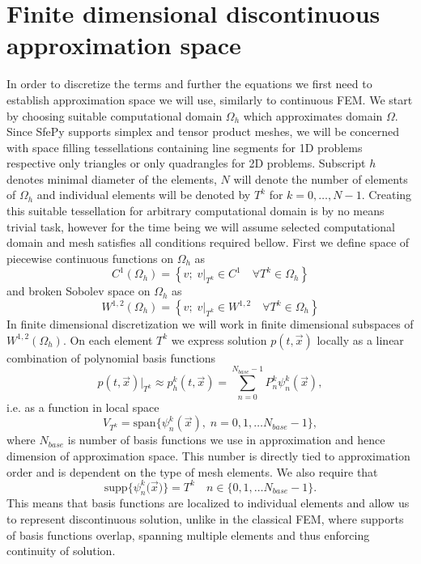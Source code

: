 \section{Finite dimensional discontinuous approximation space}
In order to discretize the terms and further the equations we first need to 
establish approximation space we will use, similarly to continuous FEM. We 
start by choosing suitable computational domain $\Omega_h$ which approximates 
domain $\Omega$. Since SfePy supports simplex and tensor product meshes, we 
will be concerned with space filling tessellations containing line segments 
for 1D problems respective only triangles or only quadrangles for 2D 
problems. Subscript $h$ denotes minimal diameter of the elements, 
$N$ will denote the number of elements of $\Omega_h$ and individual elements 
will be denoted by $T^k$ for $k=0, \ldots, N - 1$. Creating this suitable 
tessellation for arbitrary computational domain is by no means trivial task, 
however for the time being we will assume selected computational domain and 
mesh satisfies all conditions required bellow. First we define space of 
piecewise continuous functions  on $\Omega_h$ as 
\begin{equation}\label{eq:sp_conth}
    C^1(\Omega_h) =  \left\{v;\; v\vert_{T^k} \in C^1 \quad \forall T^k \in 
    \Omega_h \right\}
\end{equation}
and broken Sobolev space on $\Omega_h$ as
\begin{equation}\label{eq:sp_sobh}
    W^{1, 2}(\Omega_h) = \left\{v;\; v\vert_{T^k} \in W^{1, 2}\quad \forall T^k 
    \in \Omega_h \right\}
\end{equation}
In finite dimensional discretization we will work in finite dimensional 
subspaces of $W^{1, 2}(\Omega_h)$. On each element $T^k$ we express 
solution $p(t, \vec{x})$ locally as a linear combination of polynomial basis functions
\begin{equation}
\label{eq:el_lin_comb}
    p(t, \vec{x})|_{T^k} \approx p_h^k(t, \vec{x}) = \sum\limits_{n=0}^{N_{base} - 1} 
    P_n^k\psi^k_n(\vec{x}),
\end{equation}
i.e. as a function in local space
\begin{equation}
    V_{T^k} = \text{span}\big\{ \psi_n^k(\vec{x}), \; n = 0,1, \dots  
    N_{base}-1\big\},
\end{equation}
where $N_{base}$ is number of basis functions we use in approximation and hence 
dimension of approximation space. This number is directly tied to approximation 
order and is dependent on the type of mesh elements. We also require that
\begin{equation}
    \text{supp}\big\{\psi_n^k(\vec{x}\big)\} = T^k \quad n \in \{0,1, 
    \dots  N_{base}-1\}.
\end{equation}
This means that basis functions are localized to individual elements and allow 
us to represent discontinuous solution, unlike in the classical FEM, where 
supports of basis functions overlap, spanning multiple elements and  thus 
enforcing continuity of solution.

